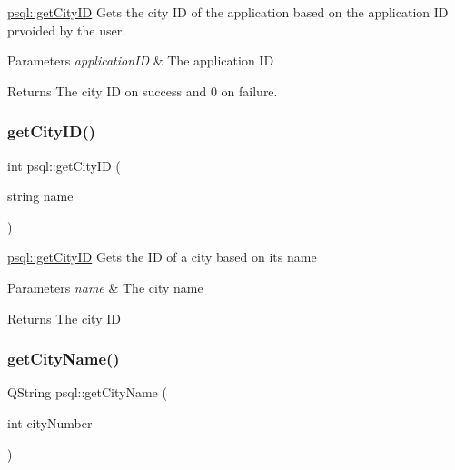 \mbox{\hyperlink{classpsql_af3462a12dc106e0ca8df4fa8fcf28436}{psql\+::get\+City\+ID}} Gets the city ID of the application based on the application ID prvoided by the user. 


\begin{DoxyParams}{Parameters}
{\em application\+ID} & The application ID \\
\hline
\end{DoxyParams}
\begin{DoxyReturn}{Returns}
The city ID on success and 0 on failure. 
\end{DoxyReturn}
\mbox{\label{classpsql_a0c33b3f48064ba75abaa4b0b58eb1ccd}} 
\subsubsection{\texorpdfstring{get\+City\+I\+D()}{getCityID()}\hspace{0.1cm}{\footnotesize\ttfamily [2/2]}}
{\footnotesize\ttfamily int psql\+::get\+City\+ID (\begin{DoxyParamCaption}\item[{string}]{name }\end{DoxyParamCaption})}



\mbox{\hyperlink{classpsql_af3462a12dc106e0ca8df4fa8fcf28436}{psql\+::get\+City\+ID}} Gets the ID of a city based on its name 


\begin{DoxyParams}{Parameters}
{\em name} & The city name \\
\hline
\end{DoxyParams}
\begin{DoxyReturn}{Returns}
The city ID 
\end{DoxyReturn}
\mbox{\label{classpsql_a7acc18034ef60c8a1e69b0e1a15d8ab2}} 
\subsubsection{\texorpdfstring{get\+City\+Name()}{getCityName()}}
{\footnotesize\ttfamily Q\+String psql\+::get\+City\+Name (\begin{DoxyParamCaption}\item[{int}]{city\+Number }\end{DoxyParamCaption})}



